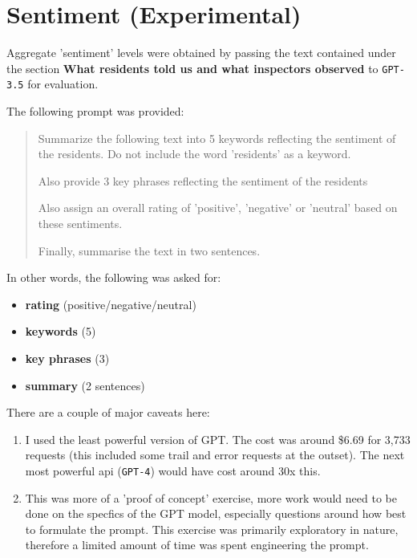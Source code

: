 \documentclass[a4paper,11pt,twoside]{article}
\begin{document}
\section{Sentiment (Experimental)}
\label{sec:org7e318e0}

Aggregate 'sentiment' levels were obtained by passing the text contained under the section \textbf{\textbf{What residents told us and what inspectors observed}} to \texttt{GPT-3.5} for evaluation.

The following prompt was provided:

\begin{quote}
Summarize the following text into 5 keywords reflecting the sentiment of the residents. Do not include the word 'residents' as a keyword.

Also provide 3 key phrases reflecting the sentiment of the residents

Also assign an overall rating of 'positive', 'negative' or 'neutral' based on these sentiments.

Finally, summarise the text in two sentences.
\end{quote}

In other words, the following was asked for:

\begin{itemize}
\item \textbf{\textbf{rating}} (positive/negative/neutral)
\item \textbf{\textbf{keywords}} (5)
\item \textbf{\textbf{key phrases}} (3)
\item \textbf{\textbf{summary}} (2 sentences)
\end{itemize}

There are a couple of major caveats here:

\begin{enumerate}
\item I used the least powerful version of GPT. The cost was around \$6.69 for 3,733 requests (this included some trail and error requests at the outset). The next most powerful api (\texttt{GPT-4}) would have cost around 30x this.
\item This was more of a 'proof of concept' exercise, more work would need to be done on the specfics of the GPT model, especially questions around how best to formulate the prompt. This exercise was primarily exploratory in nature, therefore a limited amount of time was spent engineering the prompt.
\end{enumerate}
\end{document}
